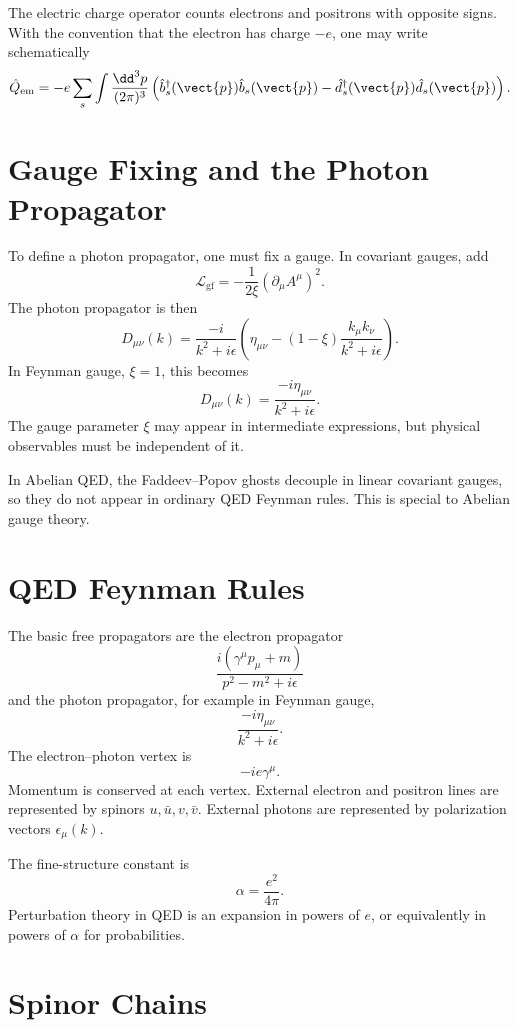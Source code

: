 The electric charge operator counts electrons and positrons with opposite signs.
With the convention that the electron has charge \(-e\), one may write
schematically
\[
    \hat Q_{\mathrm{em}}
    = -e\sum_s\int\frac{\dd^3p}{(2\pi)^3}
      \left(
          \hat b_s^\dagger(\vect{p})\hat b_s(\vect{p})
          -\hat d_s^\dagger(\vect{p})\hat d_s(\vect{p})
      \right).
\]

\section{Gauge Fixing and the Photon Propagator}

To define a photon propagator, one must fix a gauge. In covariant gauges, add
\[
    \mathcal{L}_{\mathrm{gf}}
    = -\frac{1}{2\xi}(\partial_\mu A^\mu)^2.
\]
The photon propagator is then
\[
    D_{\mu\nu}(k)
    = \frac{-i}{k^2+i\epsilon}
      \left(\eta_{\mu\nu}-(1-\xi)\frac{k_\mu k_\nu}{k^2+i\epsilon}\right).
\]
In Feynman gauge, \(\xi=1\), this becomes
\[
    D_{\mu\nu}(k)=\frac{-i\eta_{\mu\nu}}{k^2+i\epsilon}.
\]
The gauge parameter \(\xi\) may appear in intermediate expressions, but physical
observables must be independent of it.

In Abelian QED, the Faddeev--Popov ghosts decouple in linear covariant gauges,
so they do not appear in ordinary QED Feynman rules. This is special to Abelian
gauge theory.

\section{QED Feynman Rules}

The basic free propagators are the electron propagator
\[
    \frac{i(\gamma^\mu p_\mu+m)}{p^2-m^2+i\epsilon}
\]
and the photon propagator, for example in Feynman gauge,
\[
    \frac{-i\eta_{\mu\nu}}{k^2+i\epsilon}.
\]
The electron--photon vertex is
\[
    -ie\gamma^\mu.
\]
Momentum is conserved at each vertex. External electron and positron lines are
represented by spinors \(u,\bar u,v,\bar v\). External photons are represented by
polarization vectors \(\epsilon_\mu(k)\).

The fine-structure constant is
\[
    \alpha=\frac{e^2}{4\pi}.
\]
Perturbation theory in QED is an expansion in powers of \(e\), or equivalently
in powers of \(\alpha\) for probabilities.

\section{Spinor Chains}

